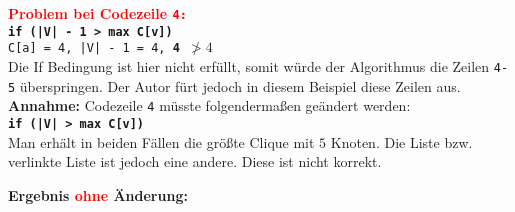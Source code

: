 \documentclass[12pt, xcolor=dvipsnames]{scrartcl}
\theoremstyle{definition}
\theoremstyle{definition}
\begin{document}

          \newpage

          \textbf{\textcolor{red}{Problem bei Codezeile \texttt{4:}}} \\
          \textbf{\texttt{if (|V| - 1 > max C[v])}} \\
          \texttt{C[a] = 4, |V| - 1 = 4, \textbf{4 $\ngtr 4$}} \\
          Die If Bedingung ist hier nicht erfüllt, somit würde der Algorithmus die Zeilen \texttt{4-5} überspringen. Der Autor fürt jedoch in diesem Beispiel diese Zeilen aus. \\
          \textbf{Annahme:} Codezeile \texttt{4} müsste folgendermaßen geändert werden:\\
          \textbf{\texttt{if (|V| > max C[v])}} \\
          Man erhält in beiden Fällen die größte Clique mit $5$ Knoten.
          Die Liste bzw. verlinkte Liste ist jedoch eine andere. Diese ist nicht korrekt. 
          
          \textbf{Ergebnis \textcolor{red}{ohne} Änderung:}
\end{document}
